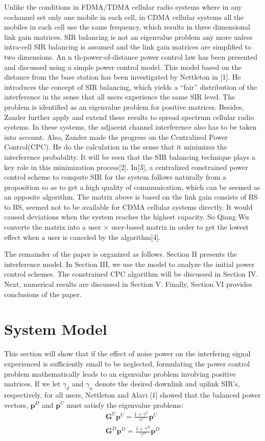 \documentclass[conference]{IEEEtran}
\begin{document}
Unlike the conditions in FDMA/TDMA cellular radio systems where in any cochannel set only one mobile in each cell, in CDMA cellular systems all the mobiles in each cell use the same frequency, which results in three dimensional link gain matrices. SIR balancing is not an eigenvalue problem any more unless intra-cell SIR balancing is assumed and the link gain matrices are simplified to two dimensions\cite{nettleton1983power}. An n th-power-of-distance power control law has been presented and discussed using a simple power control model. This model based on the distance from the base station has been investigated by Nettleton in [1]. He introduces the concept of SIR balancing, which yields a “fair” distribution of the interference in the sense that all users experience the same SIR level. The problem is identified as an eigenvalue problem for positive matrices. Besides, Zander further apply and extend these results to spread spectrum cellular radio systems. In these systems, the adjacent channel interference also has to be taken into account. Also, Zander made the progress on the Centralized Power Control(CPC). He do the calculation in the sense that it minimizes the interference probability. It will be seen that the SIR balancing technique plays a key role in this minimization process[2]. In[3], a centralized constrained power control scheme to compute SIR for the system follows naturally from a proposition so as to get a high quality of communication, which can be seemed as an opposite algorithm. The matrix above is based on the link gain consists of BS to BS, seemed not to be available for CDMA cellular systems directly. It would caused deviations when the system reaches the highest capacity. So Qiang Wu converts the matrix into a user $\times$ user-based matrix in order to get the lowest effect when a user is canceled by the algorithm[4].

The remainder of the paper is organized as follows. Section II presents the interference model. In Section III, we use the model to analyze the initial power control schemes. The constrained CPC algorithm will be discussed in Section IV. Next, numerical results are discussed in Section V. Finally, Section VI provides conclusions of the paper.




\section{System Model}
This section will show that if the effect of noise power on the interfering signal experienced is sufficiently small to be neglected, formulating the power control problem mathematically leads to an eigenvalue problem involving positive matrices. If we let $\gamma_d$ and $\gamma_u$ denote the desired downlink and uplink SIR’s, respectively, for all users, Nettleton and Alavi [1] showed that the balanced power vectors, $\bm{p}^D$ and $\bm{p}^U$ must satisfy the eigenvalue problems:
\begin{align}
\bm{G}^U \bm{p}^U = \frac{1+\gamma^U}{\gamma^U}\bm{p}^U \\
 \bm{G}^D \bm{p}^D = \frac{1+\gamma^D}{\gamma^D}\bm{p}^D
\end{align}
\end{document}
